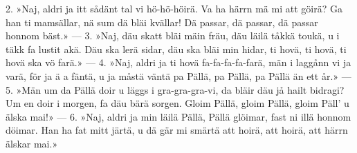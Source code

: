 2.  »Naj, aldri ja itt sådänt tal vi hö-hö-höirä.
    Va ha härrn mä mi att göirä?
    Ga han ti mamsällar, nä sum dä bläi kvällar!
    Dä passar, dä passar, dä passar honnom bäst.» —
3.  »Naj, däu skatt bläi mäin fräu, däu läilä tåkkä toukä,
    u i täkk fa lustit akä.
    Däu ska lerä sidar, däu ska bläi min hidar,
    ti hovä, ti hovä, ti hovä ska vö farä.» —
4.  »Naj, aldri ja ti hovä fa-fa-fa-fa-farä,
    män i laggånn vi ja varä,
    för ja ä a fäntä, u ja måstä väntä
    pa Pällä, pa Pällä, pa Pällä än ett år.» —
5.  »Män um da Pällä doir u läggs i gra-gra-gra-vi,
    da bläir däu jå hailt bidragi?
    Um en doir i morgen, fa däu bärä sorgen.
    Gloim Pällä, gloim Pällä, gloim Päll’ u älska mai!» —
6.  »Naj, aldri ja min läilä Pällä, Pällä glöimar,
    fast ni illä honnom döimar.
    Han ha fat mitt järtä, u dä gär mi smärtä
    att hoirä, att hoirä, att härrn älskar mai.»
